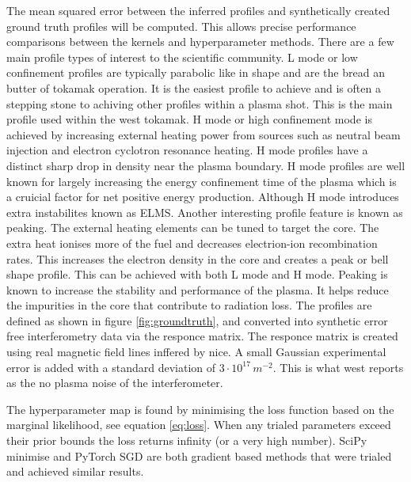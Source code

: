 The mean squared error between the inferred profiles and synthetically created ground truth profiles will be computed. This allows precise performance comparisons between the kernels and hyperparameter methods. There are a few main profile types of interest to the scientific community. L mode or low confinement profiles are typically parabolic like in shape and are the bread an butter of tokamak operation. It is the easiest profile to achieve and is often a stepping stone to achiving other profiles within a plasma shot. This is the main profile used within the \gls{west} tokamak. H mode or high confinement mode is achieved by increasing external heating power from sources such as neutral beam injection and electron cyclotron resonance heating. H mode profiles have a distinct sharp drop in density near the plasma boundary. H mode profiles are well known for largely increasing the energy confinement time of the plasma which is a cruicial factor for net positive energy production. Although H mode introduces extra instabilites known as ELMS. Another interesting profile feature is known as peaking. The external heating elements can be tuned to target the core. The extra heat ionises more of the fuel and decreases electrion-ion recombination rates. This increases the electron density in the core and creates a peak or bell shape profile. This can be achieved with both L mode and H mode. Peaking is known to increase the stability and performance of the plasma. It helps reduce the impurities in the core that contribute to radiation loss. The profiles are defined as shown in figure \ref{fig:groundtruth}, and converted into synthetic error free interferometry data via the responce matrix. The responce matrix is created using real magnetic field lines inffered by \gls{nice}. A small Gaussian experimental error is added with a standard deviation of $3\cdot10^{17} \, m^{-2}$. This is what \gls{west} reports as the no plasma noise of the interferometer.

The hyperparameter \gls{map} is found by minimising the loss function based on the marginal likelihood, see equation \ref{eq:loss}. When any trialed parameters exceed their prior bounds the loss returns infinity (or a very high number). SciPy minimise and PyTorch SGD are both gradient based methods that were trialed and achieved similar results.

